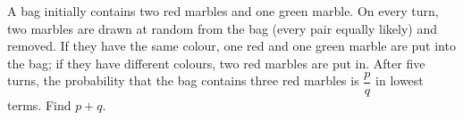 A bag initially contains two red marbles and one green marble. On every turn, two marbles are drawn at random from the bag (every pair equally likely) and removed. If they have the same colour, one red and one green marble are put into the bag; if they have different colours, two red marbles are put in. After five turns, the probability that the bag contains three red marbles is $\dfrac {p}{q}$ in lowest terms. Find $p+q$.

